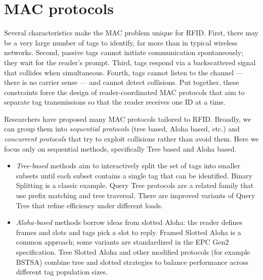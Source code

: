 \section{MAC protocols}
Several characteristics make the MAC problem unique for RFID. First, there may be a very large number of tags to identify, far more than in typical wireless networks. Second, passive tags cannot initiate communication spontaneously; they wait for the reader’s prompt. Third, tags respond via a backscattered signal that collides when simultaneous. Fourth, tags cannot listen to the channel — there is no carrier sense — and cannot detect collisions. Put together, these constraints force the design of reader-coordinated MAC protocols that aim to separate tag transmissions so that the reader receives one ID at a time.

Researchers have proposed many MAC protocols tailored to RFID. Broadly, we can group them into \textit{sequential protocols} (tree based, Aloha based, etc.) and \textit{concurrent protocols} that try to exploit collisions rather than avoid them. Here we focus only on sequential methods, specifically Tree based and Aloha based.
\begin{itemize}
    \item \textit{Tree-based} methods aim to interactively split the set of tags into smaller subsets until each subset contains a single tag that can be identified. Binary Splitting is a classic example. Query Tree protocols are a related family that use prefix matching and tree traversal. There are improved variants of Query Tree that refine efficiency under different loads.
    \item \textit{Aloha-based} methods borrow ideas from slotted Aloha: the reader defines frames and slots and tags pick a slot to reply. Framed Slotted Aloha is a common approach; some variants are standardized in the EPC Gen2 specification. Tree Slotted Aloha and other modified protocols (for example BSTSA) combine tree and slotted strategies to balance performance across different tag population sizes.
\end{itemize}

